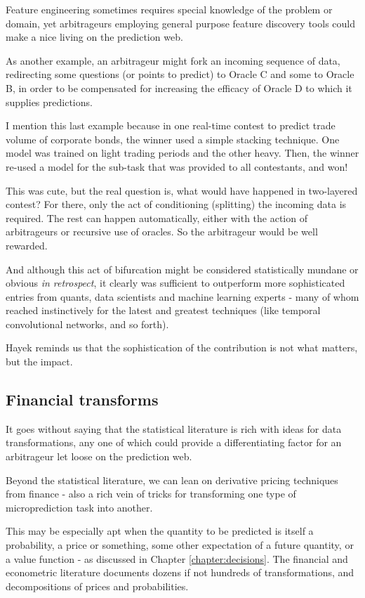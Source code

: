 Feature engineering sometimes requires special knowledge of the problem or domain, yet arbitrageurs employing general purpose feature discovery tools could make a nice living on the prediction web. 

As another example, an arbitrageur might fork an incoming sequence of data, redirecting some questions (or points to predict) to Oracle C and some to Oracle B, in order to be compensated for increasing the efficacy of Oracle D to which it supplies predictions. 
 
I mention this last example because in one real-time contest to predict trade volume of corporate bonds, the winner used a simple stacking technique. One model was trained on light trading periods and the other heavy. Then, the winner re-used a model for the sub-task that was provided to all contestants, and won! 

This was cute, but the real question is, what would have happened in two-layered contest? For there, only the act of conditioning (splitting) the incoming data is required. The rest can happen automatically, either with the action of arbitrageurs or recursive use of oracles. So the arbitrageur would be well rewarded.   

And although this act of bifurcation might be considered statistically mundane or obvious {\em in retrospect}, it clearly was sufficient to outperform more sophisticated entries from quants, data scientists and machine learning experts - many of whom reached instinctively for the latest and greatest techniques (like temporal convolutional networks, and so forth).   

Hayek reminds us that the sophistication of the contribution is not what matters, but the impact. 

\subsection{Financial transforms}

It goes without saying that the statistical literature is rich with ideas for data transformations, any one of which could provide a differentiating factor for an arbitrageur let loose on the prediction web. 

Beyond the statistical literature, we can lean on derivative pricing techniques from finance - also a rich vein of tricks for transforming one type of microprediction task into another. 

This may be especially apt when the quantity to be predicted is itself a probability, a price or something, some other expectation of a future quantity, or a value function - as discussed in Chapter \ref{chapter:decisions}. The financial and econometric literature documents dozens if not hundreds of transformations, and decompositions of prices and probabilities.


